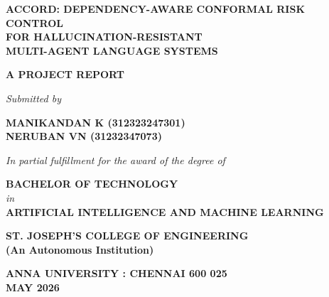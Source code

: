 \documentclass[12pt,a4paper]{report}
\begin{document}
\begin{titlepage}
  \begin{center}
    \vspace*{0.5cm}

    \textbf{\Large ACCORD: DEPENDENCY-AWARE CONFORMAL RISK CONTROL\\[6pt]
    FOR HALLUCINATION-RESISTANT\\[6pt]
    MULTI-AGENT LANGUAGE SYSTEMS}

    \vspace{1.5cm}
    \textbf{\large A PROJECT REPORT}

    \vspace{1cm}
    \textit{Submitted by}

    \vspace{0.5cm}
    \textbf{MANIKANDAN K \hspace{0.3cm}(312323247301)}\\[4pt]
    \textbf{NERUBAN VN \hspace{0.3cm}(31232347073)}

    \vspace{1.5cm}
    \textit{In partial fulfillment for the award of the degree of}

    \vspace{0.5cm}
    \textbf{BACHELOR OF TECHNOLOGY}\\[4pt]
    \textit{in}\\[4pt]
    \textbf{ARTIFICIAL INTELLIGENCE AND MACHINE LEARNING}

    \vspace{1.5cm}

    \vspace{1cm}
    \textbf{ST. JOSEPH'S COLLEGE OF ENGINEERING}\\[4pt]
    \textbf{(An Autonomous Institution)}

    \vspace{0.8cm}
    \textbf{ANNA UNIVERSITY : CHENNAI 600 025}\\[4pt]
    \textbf{MAY 2026}
  \end{center}
\end{titlepage}
\end{document}
